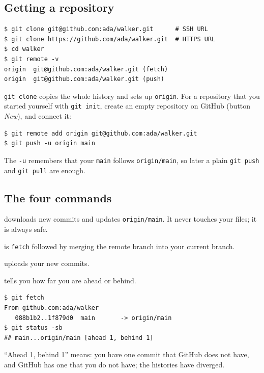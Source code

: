 \subsection*{Getting a repository}
\begin{verbatim}
$ git clone git@github.com:ada/walker.git      # SSH URL
$ git clone https://github.com/ada/walker.git  # HTTPS URL
$ cd walker
$ git remote -v
origin	git@github.com:ada/walker.git (fetch)
origin	git@github.com:ada/walker.git (push)
\end{verbatim}
\texttt{git clone} copies the whole history and sets up \texttt{origin}. For a repository that you started yourself with \texttt{git init}, create an empty repository on GitHub (button \emph{New}), and connect it:
\begin{verbatim}
$ git remote add origin git@github.com:ada/walker.git
$ git push -u origin main
\end{verbatim}
The \texttt{-u} remembers that your \texttt{main} follows \texttt{origin/main}, so later a plain \texttt{git push} and \texttt{git pull} are enough.

\subsection*{The four commands}
\begin{description}[nosep]
  \item[\texttt{git fetch}] downloads new commits and updates \texttt{origin/main}. It never touches your files; it is always safe.
  \item[\texttt{git pull}] is \texttt{fetch} followed by merging the remote branch into your current branch.
  \item[\texttt{git push}] uploads your new commits.
  \item[\texttt{git status -sb}] tells you how far you are ahead or behind.
\end{description}
\begin{verbatim}
$ git fetch
From github.com:ada/walker
   088b1b2..1f879d0  main       -> origin/main
$ git status -sb
## main...origin/main [ahead 1, behind 1]
\end{verbatim}
``Ahead 1, behind 1'' means: you have one commit that GitHub does not have, and GitHub has one that you do not have; the histories have diverged.

